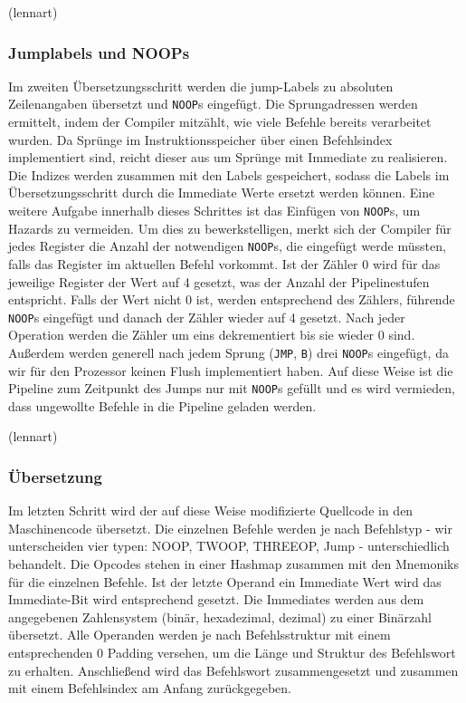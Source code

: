 \documentclass[paper=a4,fontsize=12pt,twocolumn]{scrreprt}
\begin{document}
(lennart)

\subsubsection{Jumplabels und NOOPs}
Im zweiten Übersetzungsschritt werden die jump-Labels zu absoluten Zeilenangaben übersetzt und \texttt{NOOP}s eingefügt.
Die Sprungadressen werden ermittelt, indem der Compiler mitzählt, wie viele Befehle bereits verarbeitet wurden.
Da Sprünge im Instruktionsspeicher über einen Befehlsindex implementiert sind, reicht dieser aus um Sprünge mit Immediate zu realisieren.
Die Indizes werden zusammen mit den Labels gespeichert, sodass die Labels im Übersetzungsschritt durch die Immediate Werte ersetzt werden können.
Eine weitere Aufgabe innerhalb dieses Schrittes ist das Einfügen von \texttt{NOOP}s, um Hazards zu vermeiden.
Um dies zu bewerkstelligen, merkt sich der Compiler für jedes Register die Anzahl der notwendigen \texttt{NOOP}s, die eingefügt werde müssten, falls das Register im aktuellen Befehl vorkommt.
Ist der Zähler 0 wird für das jeweilige Register der Wert auf 4 gesetzt, was der Anzahl der Pipelinestufen entspricht.
Falls der Wert nicht 0 ist, werden entsprechend des Zählers, führende \texttt{NOOP}s eingefügt und danach der Zähler wieder auf 4 gesetzt. 
Nach jeder Operation werden die Zähler um eins dekrementiert bis sie wieder 0 sind.
Außerdem werden generell nach jedem Sprung (\texttt{JMP}, \texttt{B}) drei \texttt{NOOP}s eingefügt, da wir für den Prozessor keinen Flush implementiert haben. 
Auf diese Weise ist die Pipeline zum Zeitpunkt des Jumps nur mit \texttt{NOOP}s gefüllt und es wird vermieden, dass ungewollte Befehle in die Pipeline geladen werden.

(lennart)

\subsubsection{Übersetzung}
Im letzten Schritt wird der auf diese Weise modifizierte Quellcode in den Maschinencode übersetzt.
Die einzelnen Befehle werden je nach Befehlstyp - wir unterscheiden vier typen: NOOP, TWOOP, THREEOP, Jump - unterschiedlich behandelt.
Die Opcodes stehen in einer Hashmap zusammen mit den Mnemoniks für die einzelnen Befehle.
Ist der letzte Operand ein Immediate Wert wird das Immediate-Bit wird entsprechend gesetzt.
Die Immediates werden aus dem angegebenen Zahlensystem (binär, hexadezimal, dezimal) zu einer Binärzahl übersetzt.
Alle Operanden werden je nach Befehlsstruktur mit einem entsprechenden 0 Padding versehen, um die Länge und Struktur des Befehlswort zu erhalten.
Anschließend wird das Befehlswort zusammengesetzt und zusammen mit einem Befehlsindex am Anfang zurückgegeben.
\end{document}
